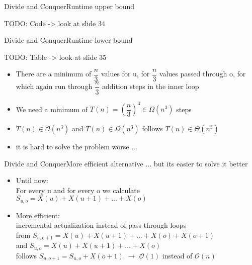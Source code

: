 
\begin{frame}{Divide and Conquer}{Runtime upper bound}
  
  TODO: Code -> look at slide 34 \vspace{2em}
  
\end{frame}


\begin{frame}{Divide and Conquer}{Runtime lower bound}

TODO: Table -> look at slide 35 \vspace{2em}

  \begin{itemize}
    \item
      There are a minimum of $\dfrac{n}{3}$ values for u, for $\dfrac{n}{3}$ 
      values passed through o, for which again run through $\dfrac{n}{3}$ 
      addition steps in the inner loop
    \item
      We need a minimum of $T(n) = \left(\dfrac{n}{3}\right)^3 \in \Omega 
      (n^3)$ steps
    \item
      $T(n) \in \mathcal{O}(n^3)$ and $T(n) \in \Omega(n^3)$ follows $T(n) \in 
      \Theta (n^3)$
    \item
      it is hard to solve the problem worse ...
  \end{itemize}
\end{frame}


\begin{frame}{Divide and Conquer}{More efficient alternative}
  ... but its easier to solve it better
  \begin{itemize}
    \item
      Until now:\\
      For every u and for every o we calculate $S_{u,o} = X(u) + X(u+1) + \dots 
      + X(o)$
    \item
      More efficient:\\
      incremental actualization instead of pass through loops\\
      from $S_{u,o+1} = X(u) + X(u+1) + \dots + X(o) + X(o+1)$\\
      and $S_{u,o} = X(u) + X(u+1) + \dots + X(o)$\\
      follows $S_{u,o+1} = S_{u,o} + X(o+1)$ $\rightarrow$ $\mathcal{O}(1)$ 
      instead of $\mathcal{O}(n)$
  \end{itemize}
\end{frame}

